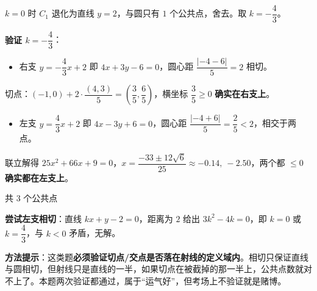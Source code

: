 \begin{answer}
$k=0$ 时 $C_1$ 退化为直线 $y=2$，与圆只有 $1$ 个公共点，舍去。取 $k=-\dfrac43$。

\Needspace{0.25\textheight}

\textbf{验证 $k=-\dfrac43$}：

\begin{itemize}
\item 右支 $y=-\dfrac43x+2$ 即 $4x+3y-6=0$，圆心距 $\dfrac{|-4-6|}5=2$  相切。
\end{itemize}
  切点：$(-1,0)+2\cdot\dfrac{(4,3)}5=\left(\dfrac35,\dfrac65\right)$，横坐标 $\dfrac35\ge0$  \textbf{确实在右支上}。
\begin{itemize}
\item 左支 $y=\dfrac43x+2$ 即 $4x-3y+6=0$，圆心距 $\dfrac{|-4+6|}5=\dfrac25<2$，相交于两点。
\end{itemize}
  联立解得 $25x^{2}+66x+9=0$，$x=\dfrac{-33\pm12\sqrt6}{25}\approx-0.14,\ -2.50$，两个都 $\le0$  \textbf{确实都在左支上}。

共 $3$ 个公共点 

\textbf{尝试左支相切}：直线 $kx+y-2=0$，距离为 $2$ 给出 $3k^{2}-4k=0$，即 $k=0$ 或 $k=\dfrac43$，与 $k<0$ 矛盾，无解。

\begin{gktip}
\textbf{方法提示}：这类题\textbf{必须验证切点/交点是否落在射线的定义域内}。相切只保证直线与圆相切，但射线只是直线的一半，如果切点在被截掉的那一半上，公共点数就对不上了。本题两次验证都通过，属于“运气好”，但考场上不验证就是赌博。
\end{gktip}

\par\medskip

\Needspace{0.5\textheight}



\end{answer}
